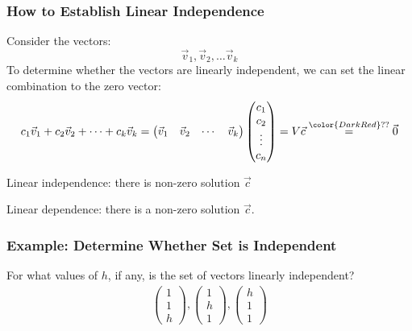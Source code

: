 \begin{frame}\frametitle{How to Establish Linear Independence}
Consider the vectors: $$\vec v_1, \vec v_2, \ldots  \vec v_k$$
To determine whether the vectors are linearly independent, we can set the linear combination to the zero vector: 
\begin{equation*}
    c_1 \vec v_1+c_2 \vec v_2+\cdots+c_k \vec v_k = 
    \begin{pmatrix} 
      \vec v_1 & \vec v_2 & \cdots & \vec v_k
    \end{pmatrix}
    \begin{pmatrix}
    c_1 \\ c_2 \\ \vdots \\ c_n
    \end{pmatrix} 
    = V \vec c  \stackrel {\color{DarkRed}??}= \vec 0
\end{equation*}

\bigskip 

Linear independence: there is  non-zero solution $\vec c$  

\bigskip 

Linear dependence: there is a non-zero solution $\vec c$.  

\end{frame}




\begin{frame}
\frametitle{Example: Determine Whether Set is Independent}

For what values of $h$, if any, is the set of vectors linearly independent?
\begin{align*}
    \begin{pmatrix} 1\\1\\ h \end{pmatrix}, 
    \begin{pmatrix} 1 \\ h \\1\end{pmatrix}, 
    \begin{pmatrix} h\\1\\1\end{pmatrix}
\end{align*}

\end{frame}

\frame{}






